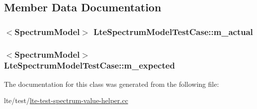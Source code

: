 \subsection{Member Data Documentation}
\subsubsection[{\texorpdfstring{m\+\_\+actual}{m_actual}}]{$<${\bf Spectrum\+Model}$>$ Lte\+Spectrum\+Model\+Test\+Case\+::m\+\_\+actual\hspace{0.3cm}{\ttfamily [protected]}}\hypertarget{classLteSpectrumModelTestCase_a74a35c0db79135c0df3ea56024a6a12c}{}\label{classLteSpectrumModelTestCase_a74a35c0db79135c0df3ea56024a6a12c}
\subsubsection[{\texorpdfstring{m\+\_\+expected}{m_expected}}]{$<${\bf Spectrum\+Model}$>$ Lte\+Spectrum\+Model\+Test\+Case\+::m\+\_\+expected\hspace{0.3cm}{\ttfamily [protected]}}\hypertarget{classLteSpectrumModelTestCase_a0926cb79b745e2245101719c1a5eee21}{}\label{classLteSpectrumModelTestCase_a0926cb79b745e2245101719c1a5eee21}


The documentation for this class was generated from the following file\+:\begin{DoxyCompactItemize}
\item 
lte/test/\hyperlink{lte-test-spectrum-value-helper_8cc}{lte-\/test-\/spectrum-\/value-\/helper.\+cc}\end{DoxyCompactItemize}
